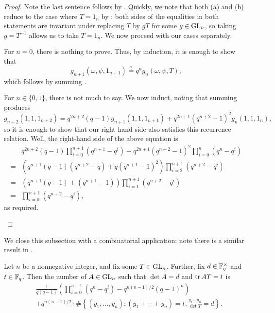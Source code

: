 \begin{proof}
    Note the last sentence follows by . Quickly, we note that both (a) and (b) reduce to the case where $T=1_n$ by : both sides of the equalities in both statements are invariant under replacing $T$ by $gT$ for some $g\in\mathrm{GL}_n$, so taking $g=T^{-1}$ allows us to take $T=1_n$. We now proceed with our cases separately.
    \begin{listalph}
        \item For $n=0$, there is nothing to prove. Thus, by induction, it is enough to show that
        \[g_{n+1}(\omega,\psi,1_{n+1})\stackrel?=q^ng_n(\omega,\psi,T),\]
        which follows by summing .
        \item For $n\in\{0,1\}$, there is not much to say. We now induct, noting that summing  produces
        \[g_{n+2}(1,1,1_{n+2})=q^{2n+2}(q-1)g_{n+1}(1,1,1_{n+1})+q^{2n+1}\left(q^{n+2}-1\right)^2g_n(1,1,1_n),\]
        so it is enough to show that our right-hand side also satisfies this recurrence relation. Well, the right-hand side of the above equation is
        \begin{align*}
            & q^{2n+2}(q-1)\prod_{i=0}^{n+1}\left(q^{n+1}-q^i\right)+q^{2n+1}\left(q^{n+2}-1\right)^2\prod_{i=0}^n\left(q^n-q^i\right) \\
            ={}& \left(q^{n+1}(q-1)\left(q^{n+2}-q\right)+q\left(q^{n+1}-1\right)^{2}\right)\prod_{i=2}^{n+1}\left(q^{n+2}-q^{i}\right) \\
            ={}& \left(q^{n+1}(q-1)+\left(q^{n+1}-1\right)\right)\prod_{i=1}^{n+1}\left(q^{n+2}-q^{i}\right) \\
            ={}& \prod_{i=0}^{n+1}\left(q^{n+2}-q^{i}\right),
        \end{align*}
        as required.
        \qedhere
    \end{listalph}
\end{proof}
We close this subsection with a combinatorial application; note there is a similar result in \cite[Theorem~6.2]{kim-gauss-sum}.
\begin{corollary}
    Let $n$ be a nonnegative integer, and fix some $T\in\mathrm{GL}_n$. Further, fix $d\in\mathbb F_q^\times$ and $t\in\mathbb F_q$. Then the number of $A\in\mathrm{GL}_n$ such that $\det A=d$ and $\operatorname{tr} AT=t$ is
    \begin{align*}
        &\frac1{q(q-1)}\left(\prod_{i=0}^{n-1}\left(q^n-q^i\right)-q^{n(n-1)/2}(q-1)^n\right) \\
        &+q^{n(n-1)/2}\cdot\#\left\{(y_1,\ldots,y_n):(y_1+\cdots+y_n)=t,\frac{y_1\cdots y_n}{\det T}=d\right\}.
    \end{align*}
\end{corollary}
